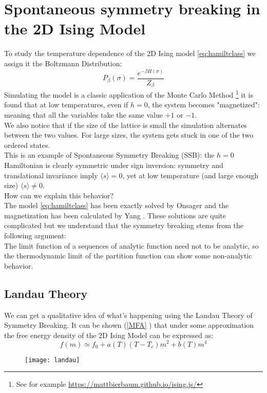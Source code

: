 \documentclass[12pt,a4paper]{article}
\begin{document}
\section{Spontaneous symmetry breaking in the 2D Ising Model}
To study the temperature dependence of the 2D Ising model \ref{eq:hamiltclass} we assign it the Boltzmann Distribution:
 \begin{equation}
	P_{\beta}(\sigma)=\frac{e^{-\beta H(\sigma)}}{Z_{\beta}}
\end{equation} 
Simulating the model is a classic application of the Monte Carlo Method \footnote{See for example \href{https://mattbierbaum.github.io/ising.js/}{https://mattbierbaum.github.io/ising.js/}} it is found that at low temperatures, even if $h=0$, the system becomes "magnetized": meaning that all the variables take the same value $+1$ or $-1$.\\ We also notice that if the size of the lattice is small the simulation alternates between the two values. For large sizes, the system gets stuck in one of the two ordered states. \\
This is an example of Spontaneous Symmetry Breaking (SSB): the $h=0$ Hamiltonian is clearly  symmetric under sign inversion: symmetry and translational invariance imply $\langle s \rangle=0$, yet at low temperature (and large enough size) $\langle s \rangle \ne 0$.  \\ 
How can we explain this behavior?\\
The model \ref{eq:hamiltclass} has been exactly solved by Onsager \cite{Huang_1987} and the magnetization has been calculated by Yang \cite{PhysRev.85.808}. These solutions are quite complicated but we understand that the symmetry breaking stems from the following argument:\\
The limit function of a sequences of analytic function need not to be analytic, so the thermodynamic limit of the partition function can show some non-analytic behavior. \\ 
\subsection{Landau Theory}
We can get a qualitative idea of what's happening using the Landau Theory of Symmetry Breaking.  
It can be shown (\ref{MFA} ) that under some approximation the free energy density of the 2D Ising Model can be expressed as:
\begin{equation}
f(m) \simeq f_{0}+a(T)\left(T-T_{c}\right) m^{2}+b(T) m^{4}
\end{equation}
\begin{figure}[h]
	\texttt{[image: landau]}
	\caption{}
	\label{fig:landau}
\end{figure}
\end{document}
